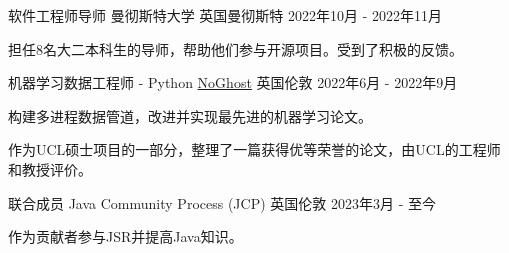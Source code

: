 
\begin{cventries}

    \cventry
    {软件工程师导师} %
    {曼彻斯特大学} %
    {英国曼彻斯特} %
    {2022年10月 - 2022年11月} %
    {
    \begin{cvitems} %
        \item {担任8名大二本科生的导师，帮助他们参与开源项目。受到了积极的反馈。}
    \end{cvitems}
    }

\cventry
    {机器学习数据工程师 - Python} %
    {\href{https://www.noghost.co.uk/}{NoGhost}} %
    {英国伦敦} %
    {2022年6月 - 2022年9月} %
    {
    \begin{cvitems} %
        \item {构建多进程数据管道，改进并实现最先进的机器学习论文。}
        \item {作为UCL硕士项目的一部分，整理了一篇获得优等荣誉的论文，由UCL的工程师和教授评价。}
    \end{cvitems}
    }

\cventry
    {联合成员} %
    {Java Community Process (JCP)} %
    {英国伦敦} %
    {2023年3月 - 至今} %
    {
    \begin{cvitems} %
        \item {作为贡献者参与JSR并提高Java知识。}
    \end{cvitems}
    }

\end{cventries}